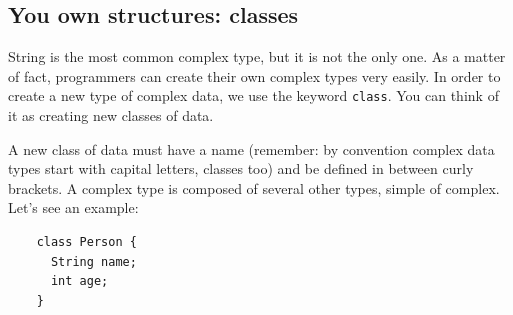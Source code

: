 






\subsection{You own structures: classes}
\label{sec:you-own-structures}

String is the most common complex type, but it is not the only one. As
a matter of fact, programmers can create their own complex
types very easily. In order to create a new type of complex data, we use the
keyword \verb+class+. You can think of it as creating new classes of
data. 

A new class of data must have a name (remember: by convention complex
data types start with capital letters, classes too) and be defined in
between curly brackets. A complex type is composed of several other
types, simple of complex. Let's see an example: 

\begin{verbatim}
    class Person {
      String name;
      int age;
    }
\end{verbatim}

